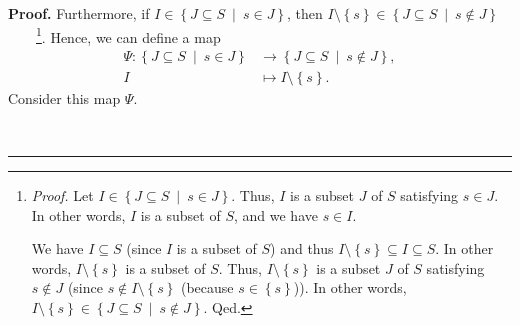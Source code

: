 \documentclass[numbers=enddot,12pt,final,onecolumn,notitlepage]{scrartcl}%
\theoremstyle{definition}
\newenvironment{proof}[1][Proof]{\noindent\textbf{#1.} }{\ \rule{0.5em}{0.5em}}
\newenvironment{verlong}{}{}
\begin{document}
\begin{verlong}
\begin{proof}
Furthermore, if $I\in\left\{  J\subseteq S\ \mid\ s\in J\right\}  $, then
$I\setminus\left\{  s\right\}  \in\left\{  J\subseteq S\ \mid\ s\notin
J\right\}  $\ \ \ \ \footnote{\textit{Proof.} Let $I\in\left\{  J\subseteq
S\ \mid\ s\in J\right\}  $. Thus, $I$ is a subset $J$ of $S$ satisfying $s\in
J$. In other words, $I$ is a subset of $S$, and we have $s\in I$.
\par
We have $I\subseteq S$ (since $I$ is a subset of $S$) and thus $I\setminus
\left\{  s\right\}  \subseteq I\subseteq S$. In other words, $I\setminus
\left\{  s\right\}  $ is a subset of $S$. Thus, $I\setminus\left\{  s\right\}
$ is a subset $J$ of $S$ satisfying $s\notin J$ (since $s\notin I\setminus
\left\{  s\right\}  $ (because $s\in\left\{  s\right\}  $)). In other words,
$I\setminus\left\{  s\right\}  \in\left\{  J\subseteq S\ \mid\ s\notin
J\right\}  $. Qed.}. Hence, we can define a map%
\begin{align*}
\Psi:\left\{  J\subseteq S\ \mid\ s\in J\right\}   &  \rightarrow\left\{
J\subseteq S\ \mid\ s\notin J\right\}  ,\\
I  &  \mapsto I\setminus\left\{  s\right\}  .
\end{align*}
Consider this map $\Psi$.


\end{proof}
\end{verlong}
\end{document}
